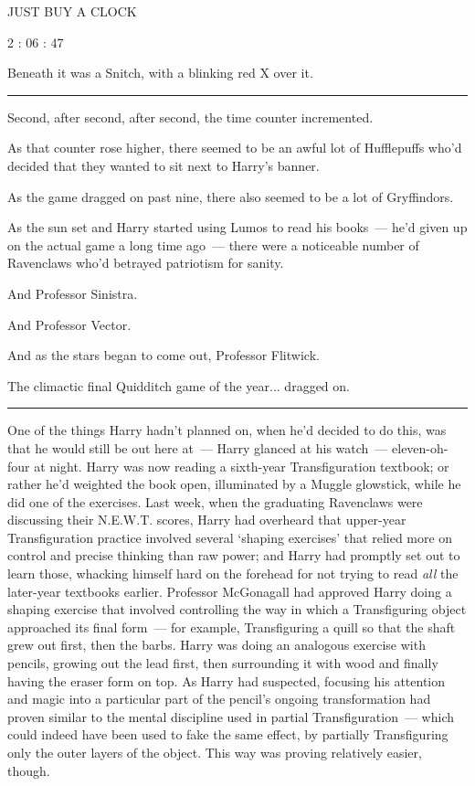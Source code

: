JUST BUY A CLOCK

2 : 06 : 47

Beneath it was a Snitch, with a blinking red X over it.

\begin{center}\rule{3in}{0.4pt}\end{center}

Second, after second, after second, the time counter incremented.

As that counter rose higher, there seemed to be an awful lot of Hufflepuffs who'd decided that they wanted to sit next to Harry's banner.

As the game dragged on past nine, there also seemed to be a lot of Gryffindors.

As the sun set and Harry started using Lumos to read his books~--- he'd given up on the actual game a long time ago~--- there were a noticeable number of Ravenclaws who'd betrayed patriotism for sanity.

And Professor Sinistra.

And Professor Vector.

And as the stars began to come out, Professor Flitwick.

The climactic final Quidditch game of the year... dragged on.

\begin{center}\rule{3in}{0.4pt}\end{center}

One of the things Harry hadn't planned on, when he'd decided to do this, was that he would still be out here at~--- Harry glanced at his watch~--- eleven-oh-four at night. Harry was now reading a sixth-year Transfiguration textbook; or rather he'd weighted the book open, illuminated by a Muggle glowstick, while he did one of the exercises. Last week, when the graduating Ravenclaws were discussing their N.E.W.T. scores, Harry had overheard that upper-year Transfiguration practice involved several `shaping exercises' that relied more on control and precise thinking than raw power; and Harry had promptly set out to learn those, whacking himself hard on the forehead for not trying to read \emph{all} the later-year textbooks earlier. Professor McGonagall had approved Harry doing a shaping exercise that involved controlling the way in which a Transfiguring object approached its final form~--- for example, Transfiguring a quill so that the shaft grew out first, then the barbs. Harry was doing an analogous exercise with pencils, growing out the lead first, then surrounding it with wood and finally having the eraser form on top. As Harry had suspected, focusing his attention and magic into a particular part of the pencil's ongoing transformation had proven similar to the mental discipline used in partial Transfiguration~--- which could indeed have been used to fake the same effect, by partially Transfiguring only the outer layers of the object. This way was proving relatively easier, though.

